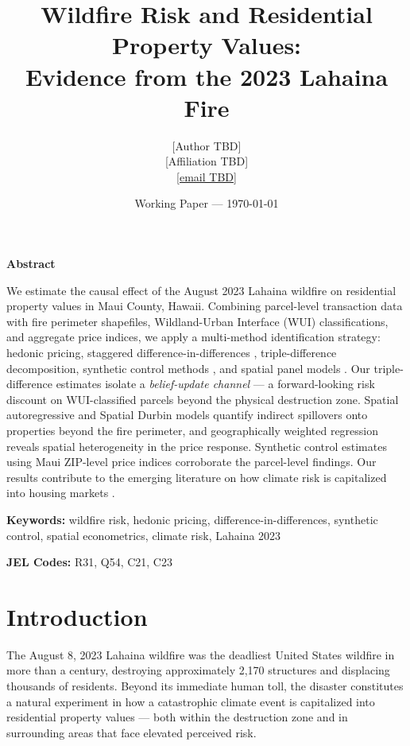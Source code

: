 \documentclass[12pt]{article}
\title{Wildfire Risk and Residential Property Values:\\
Evidence from the 2023 Lahaina Fire}
\author{[Author TBD]\\
\small [Affiliation TBD]\\
\small \href{mailto:}{[email TBD]}}
\date{Working Paper --- \today}
\renewenvironment{abstract}
  {\small\begin{center}\textbf{Abstract}\end{center}\quotation}
  {\endquotation}
\begin{document}

\maketitle

\begin{abstract}
We estimate the causal effect of the August 2023 Lahaina wildfire on residential
property values in Maui County, Hawaii. Combining parcel-level transaction data
with fire perimeter shapefiles, Wildland-Urban Interface (WUI) classifications,
and aggregate price indices, we apply a multi-method identification strategy:
hedonic pricing, staggered difference-in-differences \citep{CS2021},
triple-difference decomposition, synthetic control methods
\citep{Abadie2010,BenMichael2021,Xu2017}, and spatial panel models
\citep{LeSage2009}. Our triple-difference estimates isolate a
\emph{belief-update channel} --- a forward-looking risk discount on WUI-classified
parcels beyond the physical destruction zone. Spatial autoregressive and
Spatial Durbin models quantify indirect spillovers onto properties beyond the
fire perimeter, and geographically weighted regression reveals spatial
heterogeneity in the price response. Synthetic control estimates using Maui
ZIP-level price indices corroborate the parcel-level findings. Our results
contribute to the emerging literature on how climate risk is capitalized into
housing markets \citep{Baldauf2020,Bernstein2019}.

\smallskip
\noindent\textbf{Keywords:} wildfire risk, hedonic pricing, difference-in-differences,
synthetic control, spatial econometrics, climate risk, Lahaina 2023

\smallskip
\noindent\textbf{JEL Codes:} R31, Q54, C21, C23
\end{abstract}

\newpage
\tableofcontents
\newpage

\section{Introduction}
\label{sec:intro}

The August 8, 2023 Lahaina wildfire was the deadliest United States wildfire
in more than a century, destroying approximately 2,170 structures and displacing
thousands of residents. Beyond its immediate human toll, the disaster constitutes
a natural experiment in how a catastrophic climate event is capitalized into
residential property values --- both within the destruction zone and in surrounding
areas that face elevated perceived risk.
\end{document}
